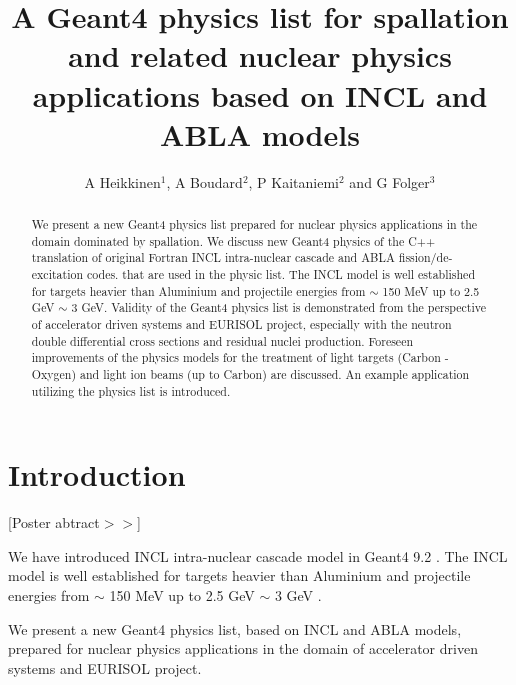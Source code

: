 \documentclass[a4paper]{jpconf}
\begin{document}
\title{A Geant4 physics list for spallation and related nuclear physics applications 
based on INCL and ABLA models}

\author{A Heikkinen$^1$, A Boudard$^2$, P Kaitaniemi$^2$ and G Folger$^3$}


\address{$^1$ Helsinki Institute of Physics, P.O. Box 64, FIN-00014 University of Helsinki, Finland}
\address{$^2$ CEN-Saclay, CEA-IRFU/SPhN, 91 191 Gif sur Yvette, France}
\address{$^3$ European Organization for Nuclear Research (CERN), Switzerland}


\begin{abstract}
We present a new Geant4 physics list prepared for nuclear physics applications
in the domain dominated by spallation.
We discuss new Geant4 physics of the C++ translation of original Fortran 
INCL intra-nuclear cascade and ABLA fission/de-excitation codes.
that are used in the physic list.
The INCL model is well established for targets heavier than Aluminium
and projectile energies from $\sim$ 150 MeV up to 2.5 GeV $\sim$ 3 GeV.
Validity of the Geant4 physics list is demonstrated from the perspective of accelerator driven systems
and EURISOL project, especially with the neutron double differential cross sections and residual
nuclei production.
Foreseen improvements of the physics models for the treatment of light targets (Carbon - Oxygen)
and light ion beams (up to Carbon) are discussed.
An example application utilizing the physics list is introduced.
\end{abstract}

\section{Introduction}
[Poster abtract$>>$]

We have introduced INCL \cite{incl} intra-nuclear cascade model in Geant4 9.2 \cite{g4}.
The INCL model is well established for targets heavier than Aluminium
and projectile energies from $\sim$ 150 MeV up to 2.5 GeV $\sim$ 3 GeV \cite{pk08bProceedings}. 


We present a new Geant4 physics list, based on INCL and ABLA models, 
prepared for nuclear physics applications in the domain
of accelerator driven systems and EURISOL project.
\end{document}
